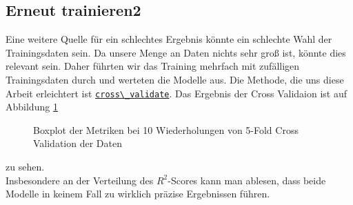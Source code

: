 \documentclass[a4paper,10pt]{scrartcl}
\begin{document}
\subsection{Erneut trainieren2}
Eine weitere Quelle für ein schlechtes Ergebnis könnte ein schlechte Wahl der Trainingsdaten sein. Da unsere Menge an Daten nichts sehr groß ist, könnte dies relevant sein. Daher führten wir das Training mehrfach mit zufälligen Trainingsdaten durch und werteten die Modelle aus. Die Methode, die uns diese Arbeit erleichtert ist \href{https://scikit-learn.org/stable/modules/generated/sklearn.model_selection.cross_validate.html}{\lstinline|cross\_validate|}. Das Ergebnis der Cross Validaion ist auf Abbildung \ref{fig:crossval}
\begin{figure}[h]
	\centering
	\caption{Boxplot der Metriken bei 10 Wiederholungen von 5-Fold Cross Validation der Daten}
	\label{fig:crossval}
\end{figure} zu sehen. \\
 Insbesondere an der Verteilung des $R^2$-Scores kann man ablesen, dass beide Modelle in keinem Fall zu wirklich präzise Ergebnissen führen. 
\end{document}
